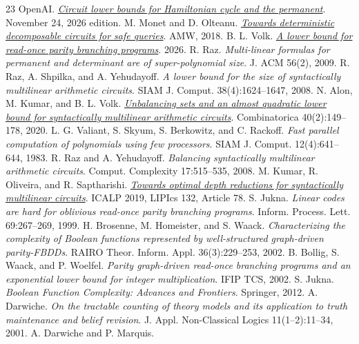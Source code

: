 \documentclass[11pt]{article}
\theoremstyle{remark}
\begin{document}
\begin{thebibliography}{23}
 OpenAI.
\href{https://github.com/openai/math/tree/main/preprints/Circuit-lower-bounds-for-Hamiltonian-cycle-and-the-permanent-November-24-2026}{\emph{Circuit lower bounds for Hamiltonian cycle and the permanent}}.
November 24, 2026 edition.
 M. Monet and D. Olteanu.
\href{https://www.cs.ox.ac.uk/dan.olteanu/papers/mo-amw18.pdf}{\emph{Towards deterministic decomposable circuits for safe queries}}.
AMW, 2018.
 B. L. Volk.
\href{https://arxiv.org/abs/2607.05944}{\emph{A lower bound for read-once parity branching programs}}. 2026.
 R. Raz.
\emph{Multi-linear formulas for permanent and determinant are of
super-polynomial size}. J. ACM 56(2), 2009.
 R. Raz, A. Shpilka, and A. Yehudayoff.
\emph{A lower bound for the size of syntactically multilinear arithmetic
circuits}. SIAM J. Comput. 38(4):1624--1647, 2008.
 N. Alon, M. Kumar, and B. L. Volk.
\href{https://arxiv.org/abs/1708.02037}{\emph{Unbalancing sets and an almost
quadratic lower bound for syntactically multilinear arithmetic circuits}}.
Combinatorica 40(2):149--178, 2020.
 L. G. Valiant, S. Skyum, S. Berkowitz, and C. Rackoff.
\emph{Fast parallel computation of polynomials using few processors}.
SIAM J. Comput. 12(4):641--644, 1983.
 R. Raz and A. Yehudayoff.
\emph{Balancing syntactically multilinear arithmetic circuits}.
Comput. Complexity 17:515--535, 2008.
 M. Kumar, R. Oliveira, and R. Saptharishi.
\href{https://doi.org/10.4230/LIPIcs.ICALP.2019.78}{\emph{Towards optimal
depth reductions for syntactically multilinear circuits}}.
ICALP 2019, LIPIcs 132, Article 78.
 S. Jukna.
\emph{Linear codes are hard for oblivious read-once parity branching
programs}. Inform. Process. Lett. 69:267--269, 1999.
 H. Brosenne, M. Homeister, and S. Waack.
\emph{Characterizing the complexity of Boolean functions represented by
well-structured graph-driven parity-FBDDs}.
RAIRO Theor. Inform. Appl. 36(3):229--253, 2002.
 B. Bollig, S. Waack, and P. Woelfel.
\emph{Parity graph-driven read-once branching programs and an exponential
lower bound for integer multiplication}. IFIP TCS, 2002.
 S. Jukna.
\emph{Boolean Function Complexity: Advances and Frontiers}. Springer, 2012.
 A. Darwiche.
\emph{On the tractable counting of theory models and its application to
truth maintenance and belief revision}.
J. Appl. Non-Classical Logics 11(1--2):11--34, 2001.
 A. Darwiche and P. Marquis.

\end{thebibliography}
\end{document}

